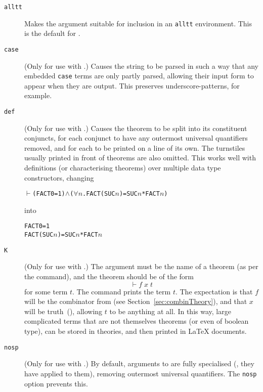 \begin{description}
\item[\texttt{alltt}] Makes the argument suitable for inclusion in an \texttt{alltt} environment.
%
This is the default for \holthm.
\item[\texttt{case}] (Only for use with \holtm.)
%
Causes the string to be parsed in such a way that any embedded \texttt{case} terms are only partly parsed, allowing their input form to appear when they are output.
%
This preserves underscore-patterns, for example.
\item[\texttt{def}] (Only for use with \holthm.)
%
Causes the theorem to be split into its constituent conjuncts, for each conjunct to have any outermost universal quantifiers removed, and for each to be printed on a line of its own.
%
The turnstiles usually printed in front of theorems are also omitted.
%
This works well with definitions (or characterising theorems) over multiple data type constructors, changing
\begin{alltt}
\(\vdash\) (FACT 0 = 1) \(\land\) (\(\forall\)\ensuremath{n}. FACT (SUC \ensuremath{n}) = SUC \ensuremath{n} * FACT \ensuremath{n})
\end{alltt}
into
\begin{alltt}
   FACT 0 = 1
   FACT (SUC \ensuremath{n}) = SUC \ensuremath{n} * FACT \ensuremath{n}
\end{alltt}

\item[\texttt{K}] (Only for use with \holtm.)
%
The argument must be the name of a theorem (as per the \holthm{} command), and the theorem should be of the form
\[
\vdash f\;x\;t
\]
for some term $t$.
%
The command prints the term $t$.
%
The expectation is that $f$ will be the combinator  from  (see Section~\ref{sec:combinTheory}), and that $x$ will be truth~(), allowing $t$ to be anything at all.
%
In this way, large complicated terms that are not themselves theorems (or even of boolean type), can be stored in \HOL{} theories, and then printed in \LaTeX{} documents.

\item[\texttt{nosp}] (Only for use with \holthm.)
%
By default, arguments to \holthm{} are fully specialised (\ie, they have  applied to them), removing outermost universal quantifiers.
%
The \texttt{nosp} option prevents this.


\end{description}
